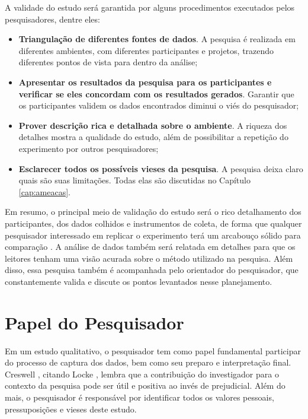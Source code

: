 A validade do estudo será garantida por alguns procedimentos executados pelos
pesquisadores, dentre eles:

\begin{itemize}
	\item \textbf{Triangulação de diferentes fontes de dados}. A pesquisa é
	realizada em diferentes ambientes, com diferentes participantes e projetos,
	trazendo diferentes pontos de vista para dentro da análise;

	\item \textbf{Apresentar os resultados da pesquisa para os participantes e
	verificar se eles concordam com os resultados gerados}. Garantir que os
	participantes validem os dados encontrados diminui o viés do pesquisador;

	\item \textbf{Prover descrição rica e detalhada sobre o ambiente}. A riqueza
	dos detalhes mostra a qualidade do estudo, além de possibilitar a repetição do
	experimento por outros pesquisadores;

	\item \textbf{Esclarecer todos os possíveis vieses da pesquisa}. A pesquisa
	deixa claro quais são suas limitações. Todas elas são discutidas no Capítulo
	\ref{cap:ameacas}.

\end{itemize}

Em resumo, o principal meio de validação do estudo será o rico detalhamento dos
participantes, dos dados colhidos e instrumentos de coleta, de forma
que qualquer pesquisador interessado em replicar o experimento terá um
arcabouço sólido para comparação \cite{merriam-1998}. A análise de
dados também será relatada em detalhes para que os leitores tenham uma visão
acurada sobre o método utilizado na pesquisa. 
Além disso, essa pesquisa também é acompanhada pelo orientador do pesquisador,
que constantemente valida e discute os pontos levantados nesse planejamento.

\section{Papel do Pesquisador}
\label{sec:planejamento-papel}

Em um estudo qualitativo, o pesquisador tem como papel fundamental participar do 
processo de captura dos dados, bem como seu preparo e interpretação final.
Creswell \cite{creswell}, citando Locke \cite{locke}, lembra
que a contribuição do investigador para o contexto da pesquisa pode ser útil e
positiva ao invés de prejudicial. Além do mais, o pesquisador é responsável por
identificar todos os valores pessoais, pressuposições e vieses deste estudo.

